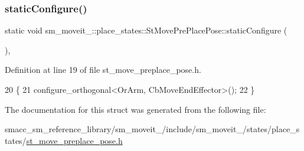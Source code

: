 \subsubsection{\texorpdfstring{static\+Configure()}{staticConfigure()}}
{\footnotesize\ttfamily static void sm\+\_\+moveit\+\_\+::place\+\_\+states\+::\+St\+Move\+Pre\+Place\+Pose\+::static\+Configure (\begin{DoxyParamCaption}{ }\end{DoxyParamCaption})\hspace{0.3cm}{\ttfamily [inline]}, {\ttfamily [static]}}



Definition at line 19 of file st\+\_\+move\+\_\+preplace\+\_\+pose.\+h.


\begin{DoxyCode}
20             \{
21                 configure\_orthogonal<OrArm, CbMoveEndEffector>();
22             \}
\end{DoxyCode}


The documentation for this struct was generated from the following file\+:\begin{DoxyCompactItemize}
\item 
smacc\+\_\+sm\+\_\+reference\+\_\+library/sm\+\_\+moveit\+\_/include/sm\+\_\+moveit\+\_/states/place\+\_\+states/\hyperlink{4_2include_2sm__moveit__4_2states_2place__states_2st__move__preplace__pose_8h}{st\+\_\+move\+\_\+preplace\+\_\+pose.\+h}\end{DoxyCompactItemize}
